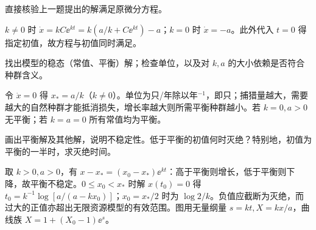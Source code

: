 \begin{exercise}\label{cw:rec01-4}
直接核验上一题提出的解满足原微分方程。
\end{exercise}
\begin{solution}
$k\ne0$ 时 $\dot x=kC\ee^{kt}=k(a/k+C\ee^{kt})-a$；$k=0$ 时 $\dot x=-a$。此外代入 $t=0$ 得指定初值，故方程与初值同时满足。
\par{}
\end{solution}

\begin{exercise}\label{cw:rec01-5}
找出模型的稳态（常值、平衡）解；检查单位，以及对 $k,a$ 的大小依赖是否符合种群含义。
\end{exercise}
\begin{solution}
令 $\dot x=0$ 得 $x_*=a/k$（$k\ne0$）。单位为只/年除以年$^{-1}$，即只；捕猎量越大，需要越大的自然种群才能抵消损失，增长率越大则所需平衡种群越小。若 $k=0,a>0$ 无平衡；若 $k=a=0$ 所有常值均为平衡。
\par{}
\end{solution}

\begin{exercise}\label{cw:rec01-6}
画出平衡解及其他解，说明不稳定性。低于平衡的初值何时灭绝？特别地，初值为平衡的一半时，求灭绝时间。
\end{exercise}
\begin{solution}
取 $k>0,a>0$，有 $x-x_*=(x_0-x_*)\ee^{kt}$：高于平衡则增长，低于平衡则下降，故平衡不稳定。$0\le x_0<x_*$ 时解 $x(t_0)=0$ 得 $t_0=k^{-1}\log[a/(a-kx_0)]$；$x_0=x_*/2$ 时为 $\log2/k$。负值应截断为灭绝，而过大的正值亦超出无限资源模型的有效范围。图用无量纲量 $s=kt,X=kx/a$，曲线族 $X=1+(X_0-1)\ee^s$。\begin{center}\end{center}
\par{}
\end{solution}

